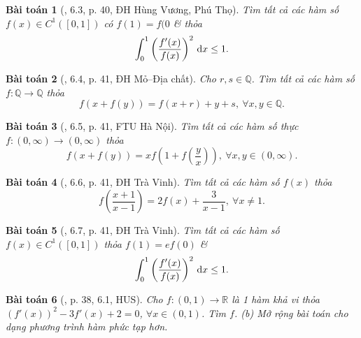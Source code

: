 \documentclass{article}
\newtheorem{baitoan}{Bài toán}
\begin{document}
\begin{baitoan}[\cite{VMS_VMC2023}, 6.3, p. 40, ĐH Hùng Vương, Phú Thọ]
	Tìm tất cả các hàm số $f(x)\in C^1([0,1])$ có $f(1) = f(0$ \& thỏa
	\begin{equation*}
		\int_0^1 \left(\dfrac{f'(x)}{f(x)}\right)^2\,{\rm d}x\le1.
	\end{equation*}
\end{baitoan}

\begin{baitoan}[\cite{VMS_VMC2023}, 6.4, p. 41, ĐH Mỏ--Địa chất]
	Cho $r,s\in\mathbb{Q}$. Tìm tất cả các hàm số $f:\mathbb{Q}\to\mathbb{Q}$ thỏa
	\begin{equation*}
		f(x + f(y)) = f(x + r) + y + s,\ \forall x,y\in\mathbb{Q}.
	\end{equation*}
\end{baitoan}

\begin{baitoan}[\cite{VMS_VMC2023}, 6.5, p. 41, FTU Hà Nội]
	Tìm tất cả các hàm số thực $f:(0,\infty)\to(0,\infty)$ thỏa
	\begin{equation*}
		f(x + f(y)) = xf\left(1 + f\left(\frac{y}{x}\right)\right),\ \forall x,y\in(0,\infty).
	\end{equation*}
\end{baitoan}

\begin{baitoan}[\cite{VMS_VMC2023}, 6.6, p. 41, ĐH Trà Vinh]
	Tìm tất cả các hàm số $f(x)$ thỏa
	\begin{equation*}
		f\left(\frac{x + 1}{x - 1}\right) = 2f(x) + \frac{3}{x - 1},\ \forall x\ne1.
	\end{equation*}
\end{baitoan}

\begin{baitoan}[\cite{VMS_VMC2023}, 6.7, p. 41, ĐH Trà Vinh]
	Tìm tất cả các hàm số $f(x)\in C^1([0,1])$ thỏa $f(1) = ef(0)$ \&
	\begin{equation*}
		\int_0^1 \left(\frac{f'(x)}{f(x)}\right)^2\,{\rm d}x\le1.
	\end{equation*}
\end{baitoan}

\begin{baitoan}[\cite{VMS_VMC2024}, p. 38, 6.1, HUS]
	Cho $f:(0,1)\to\mathbb{R}$ là 1 hàm khả vi thỏa $(f'(x))^2 - 3f'(x) + 2 = 0$, $\forall x\in(0,1)$. Tìm $f$. (b) Mở rộng bài toán cho dạng phương trình hàm phức tạp hơn.
\end{baitoan}

\end{document}
